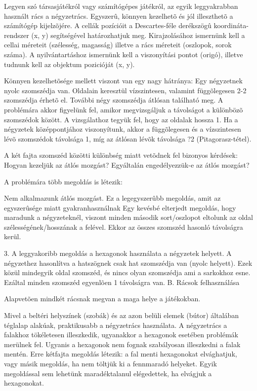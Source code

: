 
Legyen szó társasjátékról vagy számítógépes játékról, az egyik leggyakrabban használt rács a négyzetrács. Egyszerû, könnyen kezelhetõ és jól illeszthetõ a számítógép kijelzõjére. A cellák pozícióit a Descartes-féle derékszögû koordináta-rendszer (x, y) segítségével határozhatjuk meg. Kirajzolásához ismernünk kell a cellai méreteit (szélesség, magasság) illetve a rács méreteit (oszlopok, sorok száma). A nyilvántartáshoz ismernünk kell a viszonyítási pontot (origó), illetve tudnunk kell az objektum pozicióját (x, y).

Könnyen kezelhetõsége mellett viszont van egy nagy hátránya:
Egy négyzetnek nyolc szomszédja van. Oldalain keresztül vízszintesen, valamint függõlegesen 2-2 szomszédja érhetõ el. További négy szomszédja átlósan található meg. A problémára akkor figyelünk fel, amikor megvizsgáljuk a távolságot a különbözõ szomszédok között. A vizsgálathoz tegyük fel, hogy az oldalak hossza 1. Ha a négyzetek középpontjához viszonyítunk, akkor a függõlegesen és a vízszintesen lévõ szomszédok távolsága 1, míg az átlósan lévõk távolsága ?2 (Pitagorasz-tétel).

A két fajta szomszéd közötti különbség miatt vetõdnek fel bizonyos kérdések:
Hogyan kezeljük az átlós mozgást? 
Egyáltalán engedélyezzük-e az átlós mozgást? 

A problémára több megoldás is létezik:

Nem alkalmazunk átlós mozgást. Ez a legegyszerûbb megoldás, amit az egyszerûsége miatt gyakranhasználnak
Egy kevésbé elterjedt megoldás, hogy maradunk a négyzeteknél, viszont minden második sort/oszlopot eltolunk az oldal szélességének/hosszának a felével. Ekkor az összes szomszéd hasonló távolságra kerül.

3. A leggyakoribb megoldás a hexagonok használata a négyzetek helyett. A négyzethez hasonlítva a hatszögnek csak hat szomszédja van (nyolc helyett). Ezek közül mindegyik oldal szomszéd, és nincs olyan szomszédja ami a sarkokhoz esne. Ezáltal minden szomszéd egyenlõen 1 távolságra van.
B. Rácsok felhasználása

Alapvetõen mindkét rácsnak megvan a maga helye a játékokban. 

Mivel a beltéri helyszínek (szobák) és az azon belüli elemek (bútor) általában téglalap alakúak, praktikusabb a négyzetrács használata. A négyzetrács a falakhoz tökéletesen illeszkedik, ugyanakkor a hexagonok esetében problémák merülnek fel. Ugyanis a hexagonok nem fognak szabályosan illeszkedni a falak mentén. Erre kétfajta megoldás létezik: a fal menti hexagonokat elvághatjuk, vagy másik megoldás, ha nem töltjük ki a fennmaradó helyeket. Egyik megoldással sem lehetünk maradéktalanul elégedettek,
ha elvágjuk a hexagonokat. 

